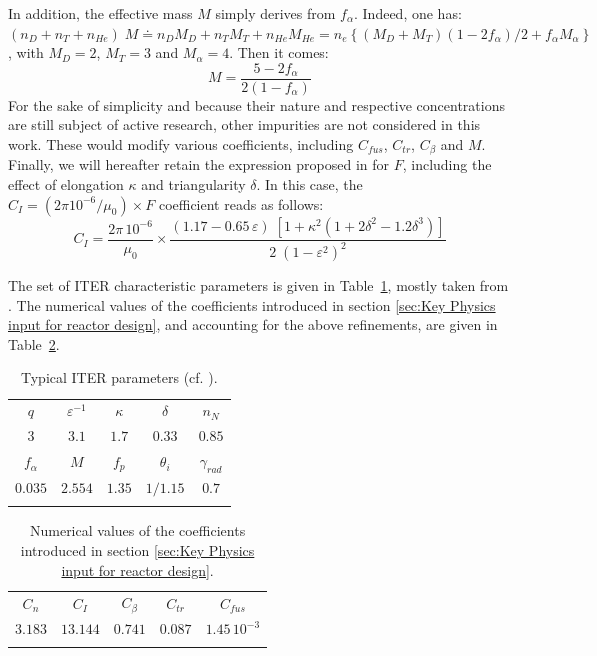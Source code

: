 \documentclass[12pt]{iopart}
\begin{document}
In addition, the effective mass $M$ simply derives from $f_\alpha$. Indeed, one has: $(n_D+n_T+n_{He})\; M \doteq n_D M_D + n_T M_T + n_{He} M_{He} =
	n_e\left\{ ( M_D +  M_T)(1-2f_\alpha)/2 + f_\alpha  M_\alpha \right\}$, with $ M_D=2$, $ M_T=3$ and $ M_\alpha=4$. Then it comes:
\begin{equation*}
 M = \frac{5 - 2f_\alpha}{2(1-f_\alpha)}
\end{equation*}
For the sake of simplicity and because their nature and respective concentrations are still subject of active research, other impurities are not considered in this work. These would modify various coefficients, including $C_{fus}$, $C_{tr}$, $C_\beta$ and $M$.
Finally, we will hereafter retain the expression proposed in \cite{Johner2011} for $F$, including the effect of elongation $\kappa$ and triangularity $\delta$. In this case, the $C_I = (2\pi 10^{-6} /\mu_0) \times F$ coefficient reads as follows:
\begin{equation*}
 C_I = \frac{2\pi\, 10^{-6}}{\mu_0} \times 
\frac{(1.17-0.65\, \varepsilon)\; \left[ 1+\kappa^2(1+2\delta^2-1.2\delta^3) \right]} {2\;(1-\varepsilon^2)^2}
\end{equation*}

The set of ITER characteristic parameters is given in Table~\ref{Tab:ITER_parameters}, mostly taken from \cite{Johner2011}. The numerical values of the coefficients introduced in section \ref{sec:Key Physics input for reactor design}, and accounting for the above refinements, are given in Table~\ref{Tab:coefficients}.
 
\begin{table}
	\caption{\label{Tab:ITER_parameters} Typical ITER parameters (cf. \cite{Johner2011}).}
	\begin{indented}
		\item[]\begin{tabular}{ccccc}
		\br
		$q$ & $\varepsilon^{-1}$ & $\kappa$ & $\delta$ & $n_N$ \\
		\mr
		$3$   & $3.1$ & $1.7$ & $0.33$ & $0.85$ \\
		\br	
		$f_\alpha$ & $M$ & $f_p$ & $\theta_i$ & $\gamma_{rad}$ \\
		\mr
		$0.035$ & $2.554$ & $1.35$ & $1/1.15$ & $0.7$ \\
		\br
	\end{tabular}
	\end{indented}
\end{table}

\begin{table}
	\caption{\label{Tab:coefficients} Numerical values of the coefficients introduced in section \ref{sec:Key Physics input for reactor design}.}
	\begin{indented}
		\item[]\begin{tabular}{ccccc}
		\br
		$C_n$ & $C_I$ & $C_\beta$ & $C_{tr}$ & $C_{fus}$ \\
		\mr
		$3.183$ & $13.144$ & $0.741$ & $0.087$ & $1.45\,10^{-3}$ \\
		\br	
	\end{tabular}
	\end{indented}
\end{table}
\end{document}
